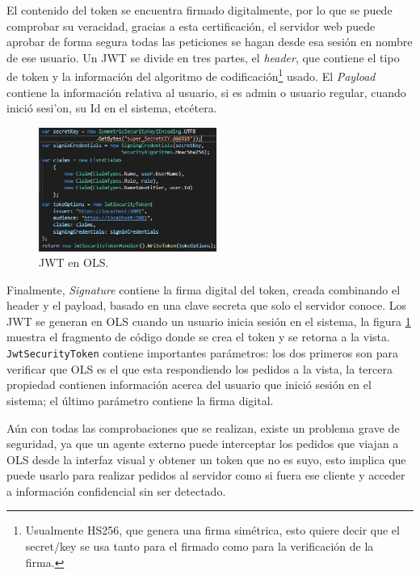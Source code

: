 El contenido del token se encuentra firmado digitalmente, por lo que se puede comprobar su veracidad, gracias a esta certificaci\'on, el servidor web puede aprobar de forma segura todas las peticiones se hagan desde esa sesi\'on en nombre de ese usuario. Un JWT se divide en tres partes, el \textit{header}, que contiene el tipo de token y la informaci\'on del algoritmo de codificaci\'on\footnote{Usualmente HS256, que genera una firma sim\'etrica, esto quiere decir que el secret/key se usa tanto para el firmado como para la verificaci\'on de la firma.} usado. El \textit{Payload} contiene la informaci\'on relativa al usuario, si es admin o usuario regular, cuando inici\'o sesi'on, su Id en el sistema, etc\'etera.

\begin{figure}
\vspace{-20pt}
\begin{center}
\includegraphics[width=0.52\textwidth]{images/jwtOLS.png} 
\end{center} \vspace{-20pt} \caption{JWT en OLS.}  \label{jwtOLS} \vspace{-10pt} 
\end{figure}

Finalmente, \textit{Signature} contiene la firma digital del token, creada combinando el header y el payload, basado en una clave secreta que solo el servidor conoce. Los JWT se generan en OLS cuando un usuario inicia sesi\'on en el sistema, la figura \ref{jwtOLS} muestra el fragmento de c\'odigo donde se crea el token y se retorna a la vista. \texttt{JwtSecurityToken} contiene importantes par\'ametros: los dos primeros son para verificar que OLS es el que esta respondiendo los pedidos a la vista, la tercera propiedad contienen informaci\'on acerca del usuario que inici\'o sesi\'on en el sistema; el \'ultimo par\'ametro contiene la firma digital.

A\'un con todas las comprobaciones que se realizan, existe un problema grave de seguridad, ya que un agente externo puede interceptar los pedidos que viajan a OLS desde la interfaz visual y obtener un token que no es suyo, esto implica que puede usarlo para realizar pedidos al servidor como si fuera ese cliente y acceder a informaci\'on confidencial sin ser detectado. 

